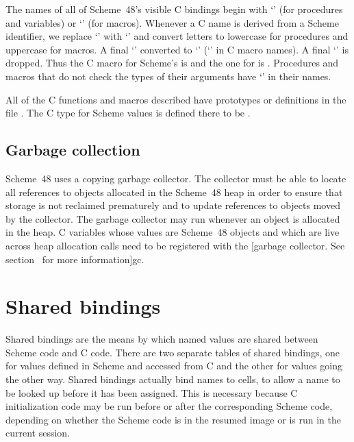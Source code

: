 The names of all of Scheme~48's visible C bindings begin 
 with `' (for procedures and variables) or 
 `' (for macros).
Whenever a C name is derived from a Scheme identifier, we
 replace `\code{-}' with `\code{\_}' and convert letters to lowercase
 for procedures and uppercase for macros.
A final `'  converted to `' (`' in C macro names).
A final `\code{!}' is dropped.
Thus the C macro for Scheme's  is  and
 the one for  is .
Procedures and macros that do not check the types of their arguments
 have `' in their names.

All of the C functions and macros described have prototypes or definitions
 in the file .
The C type for Scheme values is defined there to be .

\subsection{Garbage collection}

Scheme~48 uses a copying garbage collector.
The collector must be able to locate all references
 to objects allocated in the Scheme~48 heap in order to ensure that
 storage is not reclaimed prematurely and to update references to objects
 moved by the collector.
The garbage collector may run whenever an object is allocated in the heap.
C variables whose values are Scheme~48 objects and which are live across
 heap allocation calls need to be registered with
 the
[garbage collector.  See section~\Ref{} for more information]{gc}.

\section{Shared bindings}
\label{sec:shared-bindings}

Shared bindings are the means by which named values are shared between Scheme
 code and C code.
There are two separate tables of shared bindings, one for values defined in
 Scheme and accessed from C and the other for values going the other way.
Shared bindings actually bind names to cells, to allow a name to be looked
 up before it has been assigned.
This is necessary because C initialization code may be run before or after
 the corresponding Scheme code, depending on whether the Scheme code is in
 the resumed image or is run in the current session.

